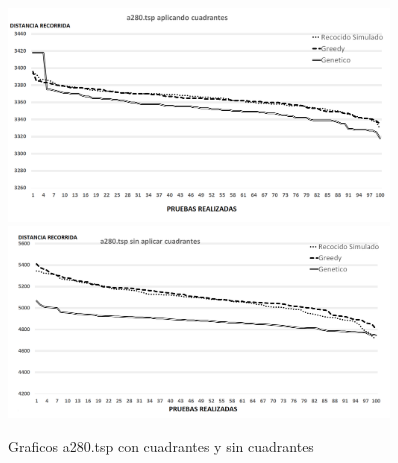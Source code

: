  \begin{figure}[hbtp]
    \centering
        \includegraphics[width=0.9\textwidth]{PruebasResultados/Experimentos_Graficos_Con/a280.png}
        \includegraphics[width=0.9\textwidth]{PruebasResultados/Experimentos_Graficos_Sin/a280.png}
        \caption{Graficos a280.tsp con cuadrantes y sin cuadrantes}
        \label{fig:a280_grafica.png}
\end{figure}
\newpage

